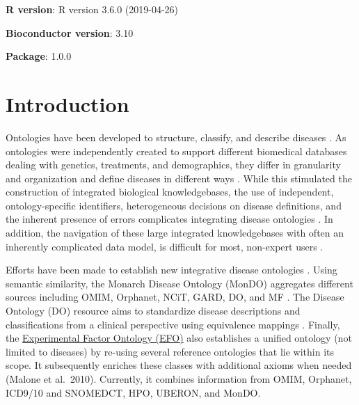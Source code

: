 \documentclass[9pt,a4paper,]{extarticle}
\begin{document}
\textbf{R version}: R version 3.6.0 (2019-04-26)

\textbf{Bioconductor version}: 3.10

\textbf{Package}: 1.0.0

\hypertarget{introduction}{%
\section{Introduction}\label{introduction}}

Ontologies have been developed to structure, classify, and describe diseases \citep{Gruber1993, Haendel2018, Hoehndorf2013}. As ontologies were independently created to support different biomedical databases dealing with genetics, treatments, and demographics, they differ in granularity and organization and define diseases in different ways \citep{Haendel2018, Hasnain2014, Hoehndorf2013, Kibbe2015, Livingston2015, Malone2010, Rappaport2013}. While this stimulated the construction of integrated biological knowledgebases, the use of independent, ontology-specific identifiers, heterogeneous decisions on disease definitions, and the inherent presence of errors complicates integrating disease ontologies \citep{Livingston2015, Rappaport2013}. In addition, the navigation of these large integrated knowledgebases with often an inherently complicated data model, is difficult for most, non-expert users \citep{Hasnain2014, Hu2017, Livingston2015}.

Efforts have been made to establish new integrative disease ontologies \citep{Mungall2017, Shefchek2019, Rappaport2013}. Using semantic similarity, the Monarch Disease Ontology (MonDO) aggregates different sources including OMIM, Orphanet, NCiT, GARD, DO, and MF \citep{Mungall2017, Shefchek2019}. The Disease Ontology (DO) resource aims to standardize disease descriptions and classifications from a clinical perspective using equivalence mappings \citep{Cheng2013, Schriml2015, Yu2015}. Finally, the \href{https://blog.opentargets.org/2019/12/19/efo3-a-community-driven-ontology-to-advance-clinical-discoveries/}{Experimental Factor Ontology (EFO)} also establishes a unified ontology (not limited to diseases) by re-using several reference ontologies that lie within its scope. It subsequently enriches these classes with additional axioms when needed (Malone et al.~2010). Currently, it combines information from OMIM, Orphanet, ICD9/10 and SNOMEDCT, HPO, UBERON, and MonDO.
\end{document}
